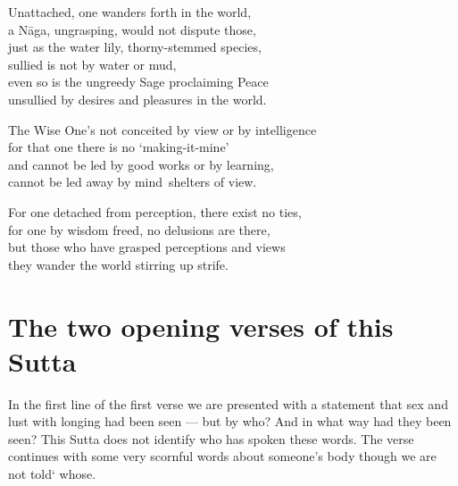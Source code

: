 \begin{MyDescription}{}
Unattached, one wanders forth in the world,\\
a N\=aga, ungrasping, would not dispute those,\\
just as the water lily, thorny-stemmed species,\\
sullied is not by water or mud,\\
even so is the ungreedy Sage proclaiming Peace\\
unsullied by desires and pleasures in the world.
\end{MyDescription} 

\begin{MyDescription}{}
The Wise One's not conceited by view or by intelligence\\
for that one there is no `making-it-mine'\\
and cannot be led by good works or by learning,\\
cannot be led away by mind~shelters of view.
\end{MyDescription} 

\begin{MyDescription}{}
For one detached from perception, there exist no ties,\\
for one by wisdom freed, no delusions are there,\\
but those who have grasped perceptions and views\\
they wander the world stirring up strife.
\end{MyDescription} 

\begin{MyDescription}[(Sn. 835-847)]{}

\end{MyDescription} 

\newpage

\section{The two opening verses of this Sutta}
In the first line of the first verse we are presented with a statement that sex and lust with longing had been seen — but by who? And in what way had they been seen? This Sutta does not identify who has spoken these words. The verse continues with some very scornful words about someone's body though we are not told` whose.\\

